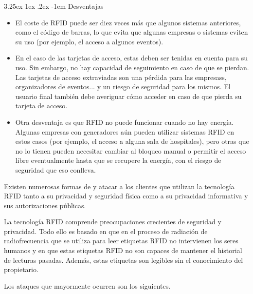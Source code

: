\documentclass[12pt,a4paper,onecolumn,oneside]{report}
\makeatletter
\newcounter{subsubsubsection}[subsubsection]
\renewcommand\paragraph{\@startsection{paragraph}{5}{\z@}%
  {3.25ex \@plus1ex \@minus.2ex}%
  {-1em}%
  {\normalfont\normalsize\bfseries}}
\makeatother
\begin{document}
\paragraph{Desventajas}
\begin{itemize}
\item El coste de RFID puede ser diez veces más que algunos sistemas anteriores, como el código de barras, lo que evita que algunas empresas o sistemas eviten su uso (por ejemplo, el acceso a algunos eventos). 
\item En el caso de las tarjetas de acceso, estas deben ser tenidas en cuenta para su uso. Sin embargo, no hay capacidad de seguimiento en caso de que se pierdan. Las tarjetas de acceso extraviadas son una pérdida para las empresass, organizadores de eventos... y un riesgo de seguridad para los mismos. El usuario final también debe averiguar cómo acceder en caso de que pierda su tarjeta de acceso.
\item Otra desventaja es que RFID no puede funcionar cuando no hay energía. Algunas empresas con generadores aún pueden utilizar sistemas RFID en estos casos (por ejemplo, el acceso a alguna sala de hospitales), pero otras que no lo tienen pueden necesitar cambiar al bloqueo manual o permitir el acceso libre eventualmente hasta que se recupere la energía, con el riesgo de seguridad que eso conlleva.
\end{itemize}


\label{Amenazas y contramedidas en RFID}

Existen numerosas formas de y atacar a los clientes que utilizan la tecnología RFID tanto a su privacidad y seguridad física como a su privacidad informativa y sus autorizaciones públicas.

La tecnología RFID comprende preocupaciones crecientes de seguridad y privacidad. Todo ello es basado en que en el proceso de radiación de radiofrecuencia que se utiliza para leer etiquetas RFID no intervienen los seres humanos y en que estas etiquetas RFID no son capaces de mantener el historial de lecturas pasadas. Además, estas etiquetas son legibles sin el conocimiento del propietario.

Los ataques que mayormente ocurren son los siguientes.
\end{document}
